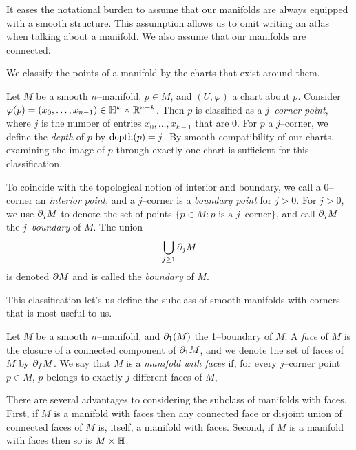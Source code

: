 It eases the notational burden to assume that our manifolds are always equipped with a smooth structure.
This assumption allows us to omit writing an atlas when talking about a manifold.
We also assume that our manifolds are connected.

We classify the points of a manifold by the charts that exist around them.

\begin{defn}
	Let $M$ be a smooth $n$--manifold, $p\in M$, and $(U,\varphi)$ a chart about $p$.
	Consider $\varphi(p)=(x_0,\dots,x_{n-1})\in \mathbb{H}^k\times\mathbb{R}^{n-k}$.
	Then $p$ is classified as a \emph{$j$--corner point}, where $j$ is the number of entries $x_0,\dots,x_{k-1}$ that are 0.
	For $p$ a $j$--corner, we define the \emph{depth} of $p$ by ${\textrm{depth}(p)}=j$.
	By smooth compatibility of our charts, examining the image of $p$ through exactly one chart is sufficient for this classification.
	
	To coincide with the topological notion of interior and boundary, we call a $0$--corner an \emph{interior point}, and a $j$--corner is a \emph{boundary point} for $j>0$.
	For $j>0$, we use $\partial_j M$ to denote the set of points $\{p\in M:p\textrm{ is a }j\textrm{--corner}\}$, and call $\partial_j M$ the \emph{$j$--boundary} of $M$.
	The union $$\bigcup_{j\geq 1} \partial_j M$$ is denoted $\partial M$ and is called the \emph{boundary} of $M$.
\end{defn}	

This classification let's us define the subclass of smooth manifolds with corners that is most useful to us.

\begin{defn}
	Let $M$ be a smooth $n$--manifold, and $\partial_1(M)$ the 1--boundary of $M$.
	A \emph{face} of $M$ is the closure of a connected component of $\partial_1 M$, and we denote the set of faces of $M$ by $\partial_f M$.
	We say that $M$ is a \emph{manifold with faces} if, for every $j$--corner point $p\in M$, $p$ belongs to exactly $j$ different faces of $M$,
\end{defn}

There are several advantages to considering the subclass of manifolds with faces.
First, if $M$ is a manifold with faces then any connected face or disjoint union of connected faces of $M$ is, itself, a manifold with faces.
Second, if $M$ is a manifold with faces then so is $M\times \mathbb{H}$.

